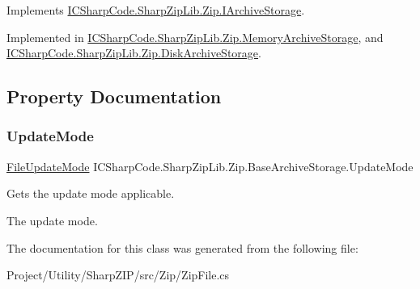 Implements \hyperlink{interface_i_c_sharp_code_1_1_sharp_zip_lib_1_1_zip_1_1_i_archive_storage_aa7e4da76c28cd9e88342bd910de38fba}{I\+C\+Sharp\+Code.\+Sharp\+Zip\+Lib.\+Zip.\+I\+Archive\+Storage}.



Implemented in \hyperlink{class_i_c_sharp_code_1_1_sharp_zip_lib_1_1_zip_1_1_memory_archive_storage_af536ce3c423efbc86e645382bc588deb}{I\+C\+Sharp\+Code.\+Sharp\+Zip\+Lib.\+Zip.\+Memory\+Archive\+Storage}, and \hyperlink{class_i_c_sharp_code_1_1_sharp_zip_lib_1_1_zip_1_1_disk_archive_storage_afa463d93f03caa3af6e4ea89a1314a99}{I\+C\+Sharp\+Code.\+Sharp\+Zip\+Lib.\+Zip.\+Disk\+Archive\+Storage}.



\subsection{Property Documentation}
\mbox{\label{class_i_c_sharp_code_1_1_sharp_zip_lib_1_1_zip_1_1_base_archive_storage_a7cf854d56eeb0f854e4cad9375ac4527}} 
\subsubsection{\texorpdfstring{Update\+Mode}{UpdateMode}}
{\footnotesize\ttfamily \hyperlink{namespace_i_c_sharp_code_1_1_sharp_zip_lib_1_1_zip_a626313bc452203ca2bdb092947541027}{File\+Update\+Mode} I\+C\+Sharp\+Code.\+Sharp\+Zip\+Lib.\+Zip.\+Base\+Archive\+Storage.\+Update\+Mode\hspace{0.3cm}{\ttfamily [get]}}



Gets the update mode applicable. 

The update mode.

The documentation for this class was generated from the following file\+:\begin{DoxyCompactItemize}
\item 
Project/\+Utility/\+Sharp\+Z\+I\+P/src/\+Zip/Zip\+File.\+cs\end{DoxyCompactItemize}
